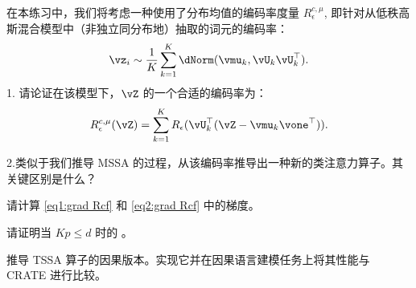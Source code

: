 \documentclass[../../book-main_zh.tex]{subfiles}
\begin{document}
\begin{exercise}
    在本练习中，我们将考虑一种使用了分布均值的编码率度量 \(R_{\epsilon}^{c, \mu}\), 即针对从低秩高斯混合模型中（非独立同分布地）抽取的词元的编码率：
    \begin{equation}
        \vz_{i} \sim \frac{1}{K}\sum_{k = 1}^{K}\dNorm(\vmu_{k},
        \vU_{k}\vU_{k}^{\top}).
    \end{equation}
    1. 请论证在该模型下，\(\vZ\) 的一个合适的编码率为：
    \begin{equation}
        R_{\epsilon}^{c, \mu}(\vZ) = \sum_{k =
        1}^{K}R_{\epsilon}(\vU_{k}^{\top}(\vZ - \vmu_{k}\vone^{\top})).
    \end{equation}
    \smallskip

    \noindent
    2.类似于我们推导 MSSA 的过程，从该编码率推导出一种新的类注意力算子。其关键区别是什么？
    \medskip
        
\end{exercise}

\begin{exercise}
    请计算 \eqref{eq1:grad Rcf} 和 \eqref{eq2:grad Rcf} 中的梯度。
\end{exercise}

\begin{exercise}
    请证明当 $Kp \le d$ 时的 。
\end{exercise}

\begin{exercise}
    推导 TSSA 算子的因果版本。实现它并在因果语言建模任务上将其性能与 CRATE 进行比较。
\end{exercise}
\end{document}
